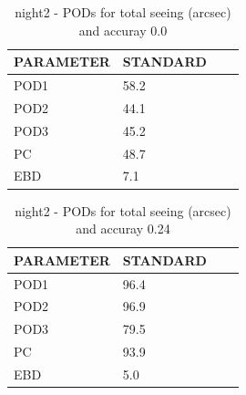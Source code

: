 \begin{table}[p!]
\begin{center}
\begin{tabular}{|l|l|l|l|}
\hline
\multicolumn{1}{|c|}{\cellcolor[HTML]{C0C0C0}\textbf{PARAMETER}} & \multicolumn{1}{c|}{\cellcolor[HTML]{C0C0C0}\textbf{STANDARD}}\\
\hline
\cellcolor[HTML]{C0C0C0}POD1  & 58.2                                \\
\cellcolor[HTML]{C0C0C0}POD2  & 44.1                                \\
\cellcolor[HTML]{C0C0C0}POD3  & 45.2                                \\
\cellcolor[HTML]{C0C0C0}PC    & 48.7                                  \\
\cellcolor[HTML]{C0C0C0}EBD   & 7.1                                 \\
\hline
\end{tabular}
\caption{night2 - PODs for total seeing (arcsec) and accuray 0.0}
\label{tab:podsee0.0:night2}
\end{center}
\end{table}
\begin{table}[p!]
\begin{center}
\begin{tabular}{|l|l|l|l|}
\hline
\multicolumn{1}{|c|}{\cellcolor[HTML]{C0C0C0}\textbf{PARAMETER}} & \multicolumn{1}{c|}{\cellcolor[HTML]{C0C0C0}\textbf{STANDARD}}\\
\hline
\cellcolor[HTML]{C0C0C0}POD1  & 96.4                                \\
\cellcolor[HTML]{C0C0C0}POD2  & 96.9                                \\
\cellcolor[HTML]{C0C0C0}POD3  & 79.5                                \\
\cellcolor[HTML]{C0C0C0}PC    & 93.9                                  \\
\cellcolor[HTML]{C0C0C0}EBD   & 5.0                                 \\
\hline
\end{tabular}
\caption{night2 - PODs for total seeing (arcsec) and accuray 0.24}
\label{tab:podsee0.24:night2}
\end{center}
\end{table}
